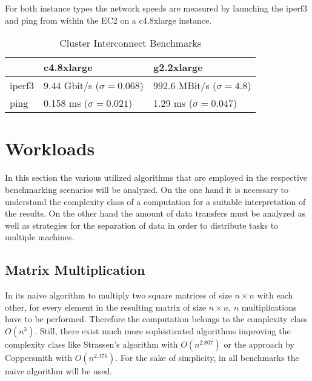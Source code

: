 For both instance types the network speeds are measured by launching the iperf3 and ping from within the EC2 on a c4.8xlarge instance.

\begin{table}[!htb]
	\centering
	\begin{adjustbox}{width=0.5\textwidth}
		\small
		\begin{tabular}{l | l | l}
			~                     & c4.8xlarge               			& g2.2xlarge                \\
			\hline
			iperf3                & 9.44 Gbit/s ($\sigma = 0.068$) 	& 992.6 MBit/s ($\sigma = 4.8$) \\
			ping                  & 0.158 ms ($\sigma = 0.021$)  		& 1.29 ms ($\sigma = 0.047$)  \\
		\end{tabular}
	\end{adjustbox}
	
	\caption{Cluster Interconnect Benchmarks}
	\label{table:cluster_interconnect_benchmarks}
\end{table}


\section{Workloads}
\label{workload_explanation}
In this section the various utilized algorithms that are employed in the respective benchmarking scenarios will be analyzed. On the one hand it is necessary to understand the complexity class of a computation for a suitable interpretation of the results. On the other hand the amount of data transfers must be analyzed as well as strategies for the separation of data in order to distribute tasks to multiple machines.

\subsection*{Matrix Multiplication}
\label{matrix_multiplication_workload}
In its naive algorithm to multiply two square matrices of size $n\times n$ with each other, for every element in the resulting matrix of size $n\times n$, $n$ multiplications have to be performed. Therefore the computation belongs to the complexity class $O(n^3)$. Still, there exist much more sophisticated algorithms improving the complexity class like Strassen's algorithm with $O(n^{2.807})$\cite{strassen} or the approach by Coppersmith with $O(n^{2.376})$\cite{coppersmith}. For the sake of simplicity, in all benchmarks the naive algorithm will be used.

